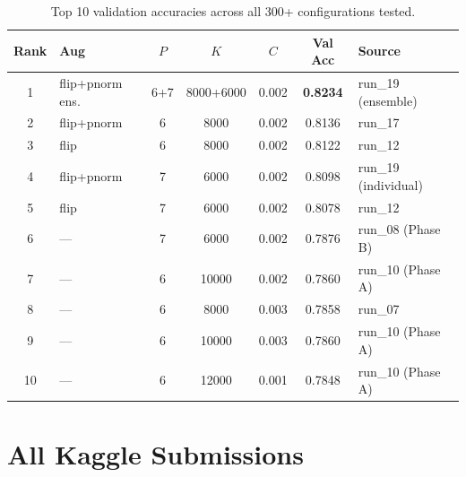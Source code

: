\documentclass[11pt,a4paper]{article}
\begin{document}
\begin{table}[H]
\centering
\caption{Top 10 validation accuracies across all 300+ configurations tested.}
\label{tab:top10}
\small
\begin{tabular}{@{}clccccl@{}}
\toprule
Rank & Aug & $P$ & $K$ & $C$ & Val Acc & Source \\
\midrule
1 & flip+pnorm ens. & 6+7 & 8000+6000 & 0.002 & \textbf{0.8234} & run\_19 (ensemble) \\
2 & flip+pnorm & 6 & 8000 & 0.002 & 0.8136 & run\_17 \\
3 & flip & 6 & 8000 & 0.002 & 0.8122 & run\_12 \\
4 & flip+pnorm & 7 & 6000 & 0.002 & 0.8098 & run\_19 (individual) \\
5 & flip & 7 & 6000 & 0.002 & 0.8078 & run\_12 \\
6 & --- & 7 & 6000 & 0.002 & 0.7876 & run\_08 (Phase B) \\
7 & --- & 6 & 10000 & 0.002 & 0.7860 & run\_10 (Phase A) \\
8 & --- & 6 & 8000 & 0.003 & 0.7858 & run\_07 \\
9 & --- & 6 & 10000 & 0.003 & 0.7860 & run\_10 (Phase A) \\
10 & --- & 6 & 12000 & 0.001 & 0.7848 & run\_10 (Phase A) \\
\bottomrule
\end{tabular}
\end{table}

\section{All Kaggle Submissions}
\label{app:submissions}
\end{document}
